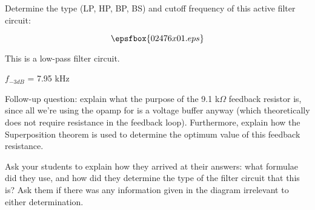 

Determine the type (LP, HP, BP, BS) and cutoff frequency of this active filter circuit:

$$\epsfbox{02476x01.eps}$$







This is a low-pass filter circuit.

$f_{-3dB}$ = 7.95 kHz

\vskip 10pt

Follow-up question: explain what the purpose of the 9.1 k$\Omega$ feedback resistor is, since all we're using the opamp for is a voltage buffer anyway (which theoretically does not require resistance in the feedback loop).  Furthermore, explain how the Superposition theorem is used to determine the optimum value of this feedback resistance.







Ask your students to explain how they arrived at their answers: what formulae did they use, and how did they determine the type of the filter circuit that this is?  Ask them if there was any information given in the diagram irrelevant to either determination.




